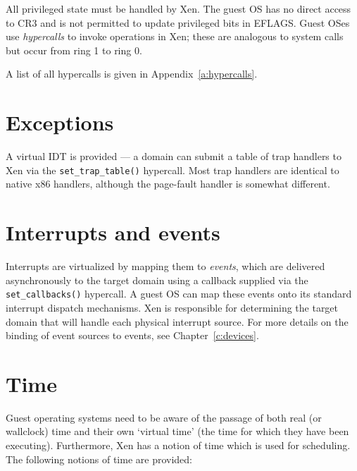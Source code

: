 \documentclass[11pt,twoside,final,openright]{report}
\begin{document}
All privileged state must be handled by Xen.  The guest OS has no
direct access to CR3 and is not permitted to update privileged bits in
EFLAGS. Guest OSes use \emph{hypercalls} to invoke operations in Xen; 
these are analogous to system calls but occur from ring 1 to ring 0. 

A list of all hypercalls is given in Appendix~\ref{a:hypercalls}. 



\section{Exceptions}

A virtual IDT is provided --- a domain can submit a table of trap
handlers to Xen via the {\tt set\_trap\_table()} hypercall.  Most trap
handlers are identical to native x86 handlers, although the page-fault
handler is somewhat different.


\section{Interrupts and events}

Interrupts are virtualized by mapping them to \emph{events}, which are
delivered asynchronously to the target domain using a callback
supplied via the {\tt set\_callbacks()} hypercall.  A guest OS can map
these events onto its standard interrupt dispatch mechanisms.  Xen is
responsible for determining the target domain that will handle each
physical interrupt source. For more details on the binding of event
sources to events, see Chapter~\ref{c:devices}. 



\section{Time}

Guest operating systems need to be aware of the passage of both real
(or wallclock) time and their own `virtual time' (the time for
which they have been executing). Furthermore, Xen has a notion of 
time which is used for scheduling. The following notions of 
time are provided: 
\end{document}
